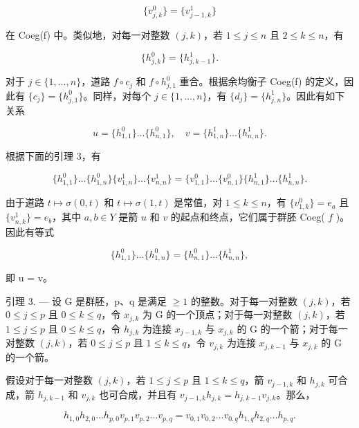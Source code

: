 \[
\{v _ {j, k} ^ {0} \} = \{v _ {j - 1, k} ^ {1} \}\tag{3}
\]

在 Coeg(f) 中。类似地，对每一对整数 \((j,k)\)，若 \(1 \leqslant j \leqslant n\) 且 \(2 \leqslant k \leqslant n\)，有

\[
\{h _ {j, k} ^ {0} \} = \{h _ {j, k - 1} ^ {1} \}.\tag{4}
\]

对于 \(j \in \{1, \ldots, n\}\)，道路 \(f \circ c_j\) 和 \(f \circ h_{j,1}^0\) 重合。根据余均衡子 Coeg(f) 的定义，因此有 \(\{c_j\} = \{h_{j,1}^0\}\)。同样，对每个 \(j \in \{1, \ldots, n\}\)，有 \(\{d_j\} = \{h_{j,n}^1\}\)。因此有如下关系

\[
u = \{h _ {1, 1} ^ {0} \} \dots \{h _ {n, 1} ^ {0} \}, \quad v = \{h _ {1, n} ^ {1} \} \dots \{h _ {n, n} ^ {1} \}.
\]

根据下面的引理 3，有

\[
\{h _ {1, 1} ^ {0} \} \dots \{h _ {1, n} ^ {0} \} \{v _ {1, n} ^ {1} \} \dots \{v _ {n, n} ^ {1} \} = \{v _ {1, 1} ^ {0} \} \dots \{v _ {n, 1} ^ {0} \} \{h _ {n, 1} ^ {1} \} \dots \{h _ {n, n} ^ {1} \}.
\]

由于道路 \(t \mapsto \sigma(0,t)\) 和 \(t \mapsto \sigma(1,t)\) 是常值，对 \(1 \leqslant k \leqslant n\)，有 \(\{v_{1,k}^{0}\} = e_{a}\) 且 \(\{v_{n,k}^{1}\} = e_{b}\)，其中 \(a,b \in Y\) 是箭 \(u\) 和 \(v\) 的起点和终点，它们属于群胚 Coeg( \(f\) )。因此有等式

\[
\{h _ {1, 1} ^ {0} \} \dots \{h _ {1, n} ^ {0} \} = \{h _ {n, 1} ^ {0} \} \dots \{h _ {n, n} ^ {1} \},
\]

即 u = v。

引理 3. --- 设 G 是群胚，p、q 是满足 \(\geqslant 1\) 的整数。对于每一对整数 \((j, k)\)，若 \(0 \leqslant j \leqslant p\) 且 \(0 \leqslant k \leqslant q\)，令 \(x_{j,k}\) 为 G 的一个顶点；对于每一对整数 \((j, k)\)，若 \(1 \leqslant j \leqslant p\) 且 \(0 \leqslant k \leqslant q\)，令 \(h_{j,k}\) 为连接 \(x_{j-1,k}\) 与 \(x_{j,k}\) 的 G 的一个箭；对于每一对整数 \((j, k)\)，若 \(0 \leqslant j \leqslant p\) 且 \(1 \leqslant k \leqslant q\)，令 \(v_{j,k}\) 为连接 \(x_{j,k-1}\) 与 \(x_{j,k}\) 的 G 的一个箭。

假设对于每一对整数 \((j,k)\)，若 \(1 \leqslant j \leqslant p\) 且 \(1 \leqslant k \leqslant q\)，箭 \(v_{j-1,k}\) 和 \(h_{j,k}\) 可合成，箭 \(h_{j,k-1}\) 和 \(v_{j,k}\) 也可合成，并且有 \(v_{j-1,k}h_{j,k} = h_{j,k-1}v_{j,k}\)。那么，

\[
h _ {1, 0} h _ {2, 0} \dots h _ {p, 0} v _ {p, 1} v _ {p, 2} \dots v _ {p, q} = v _ {0, 1} v _ {0, 2} \dots v _ {0, q} h _ {1, q} h _ {2, q} \dots h _ {p, q}.
\]

